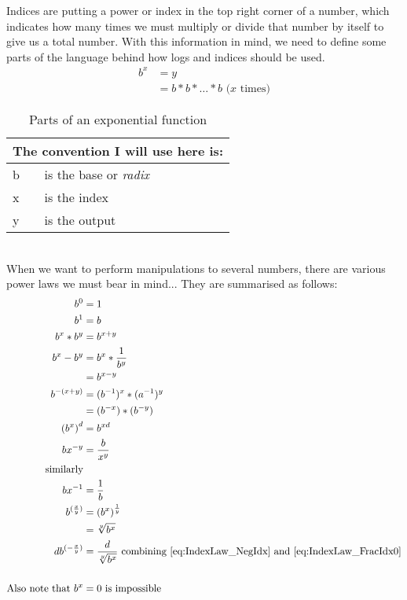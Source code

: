 Indices are putting a power or index in the top right corner of a number,
which indicates how many times we must multiply or divide that number by
itself to give us a total number. With this information in mind, we need to
define some parts of the language behind how logs and indices should be
used.
\begin{align}
  {b}^{x} & = y \label{eq:IdxForm} \\
          & = b * b * \ldots * b \text{ ($x$ times)}
\end{align}
\begin{table}[!hbt]
\label{tab:PartsOfAnExponential}
\begin{tabularx}{\linewidth}{| l X |}
\hline
\multicolumn{2}{|l|}{The convention I will use here is:} \\
\hline \hline
b & is the base or \emph{radix}\\
x & is the index\\
y & is the output\\
\hline
\end{tabularx}
\caption{Parts of an exponential function}
\end{table}
\\
When we want to perform manipulations to several numbers, there are various
power laws we must bear in mind... They are summarised as follows:
\begin{align}
  {b}^{0}               & = 1 \label{eq:IndexLaw_Power0} \\
  {b}^{1}               & = b \label{eq:IndexLaw_Power1} \\
  {b}^{x} * {b}^{y}     & = {b}^{x+y} \label{eq:IndexLaw_AddIdxs} \\
  {b}^{x} - {b}^{y}     & = b^x * \frac{1}{b^y} \\
                        & = {b}^{x-y} \label{eq:IndexLaw_SubIdxs} \\
  {b}^{-(x+y)}          & = ({b}^{-1})^{x} * (a^{-1})^y \\
                        & = (b^{-x}) * (b^{-y}) \\
  {({b}^{x})}^{d}       & = {b}^{xd} \label{eq:IndexLaw_MultIdxs} \\
  b{x}^{-y}             & = \frac{b}{{x}^{y}} \label{eq:IndexLaw_NegIdx} \\
  \text{similarly} \nonumber \\
  b{x}^{-1}             & = \frac{1}{b} \label{eq:IndexLaw_Neg1} \\
  {b}^{(\frac{x}{y})}   & = {({b}^{x})}^{\frac{1}{y}}
                            \label{eq:IndexLaw_FracIdx0} \\
                        & = \sqrt[y]{{b}^{x}} \label{eq:IndexLaw_FracIdx1}\\
  d{b}^{(-\frac{x}{y})} & = \frac{d}{\sqrt[y]{{b}^{x}}} ~ \text{combining \eqref{eq:IndexLaw_NegIdx} and \eqref{eq:IndexLaw_FracIdx0}} \\
  \nonumber \\
  \text{Also note that }
  {b}^{x}               & = 0 ~ \text{is impossible} \label{eq:IndexLaw_EqualsZero}
\end{align}
